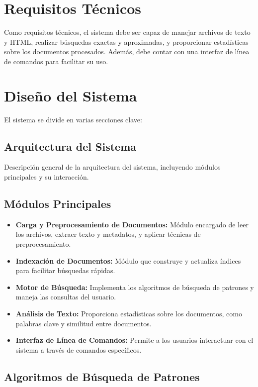 \documentclass[9pt,letterpaper,onecolumn]{rho-class/rho}
\begin{document}
\section{Requisitos Técnicos}
Como requisitos técnicos, el sistema debe ser capaz de manejar archivos de texto y HTML, realizar búsquedas exactas y aproximadas, y proporcionar estadísticas sobre los documentos procesados. Además, debe contar con una interfaz de línea de comandos para facilitar su uso.
\section{Diseño del Sistema}
El sistema se divide en varias secciones clave:
\subsection{Arquitectura del Sistema}
Descripción general de la arquitectura del sistema, incluyendo módulos principales y su interacción.
\subsection{Módulos Principales}
\begin{itemize}
    \item \textbf{Carga y Preprocesamiento de Documentos:} Módulo encargado de leer los archivos, extraer texto y metadatos, y aplicar técnicas de preprocesamiento.
    \item \textbf{Indexación de Documentos:} Módulo que construye y actualiza índices para facilitar búsquedas rápidas.
    \item \textbf{Motor de Búsqueda:} Implementa los algoritmos de búsqueda de patrones y maneja las consultas del usuario.
    \item \textbf{Análisis de Texto:} Proporciona estadísticas sobre los documentos, como palabras clave y similitud entre documentos.
    \item \textbf{Interfaz de Línea de Comandos:} Permite a los usuarios interactuar con el sistema a través de comandos específicos.

\end{itemize}

\subsection{Algoritmos de Búsqueda de Patrones}
\end{document}

